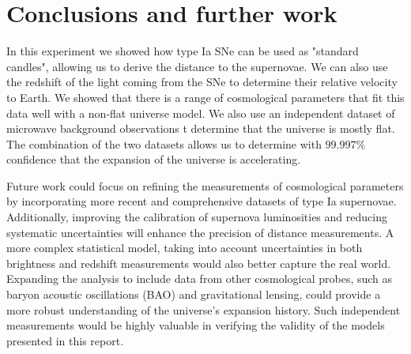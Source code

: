 \documentclass[11pt]{article}
\begin{document}
\section{Conclusions and further work} \label{sec:conclusions}
In this experiment we showed how type Ia SNe can be used as "standard candles", allowing us to derive the distance to the supernovae. We can also use the redshift of the light coming from the SNe to determine their relative velocity to Earth. We showed that there is a range of cosmological parameters that fit this data well with a non-flat universe model. We also use an independent dataset of microwave background observations t determine that the universe is mostly flat. The combination of the two datasets allows us to determine with $99.997\%$ confidence that the expansion of the universe is accelerating. 

Future work could focus on refining the measurements of cosmological parameters by incorporating more recent and comprehensive datasets of type Ia supernovae. Additionally, improving the calibration of supernova luminosities and reducing systematic uncertainties will enhance the precision of distance measurements. A more complex statistical model, taking into account uncertainties in both brightness and redshift measurements would also better capture the real world. Expanding the analysis to include data from other cosmological probes, such as baryon acoustic oscillations (BAO) and gravitational lensing, could provide a more robust understanding of the universe's expansion history. Such independent measurements would be highly valuable in verifying the validity of the models presented in this report. 





\end{document}
